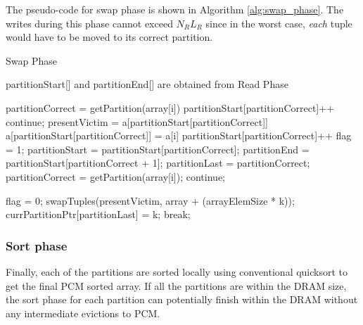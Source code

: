 The pseudo-code for swap phase is shown in Algorithm \ref{alg:swap_phase}. The writes during this phase cannot exceed $N_R L_R$ since in the worst case, \emph{each} tuple would have to be moved to its correct partition.

\begin{algorithm}
\caption{Swap Phase}
\label{alg:swap_phase}
partitionStart[] and partitionEnd[] are obtained from Read Phase
\begin{algorithmic}[1]
	\State partitionCorrect = getPartition(array[i])
     \State partitionStart[partitionCorrect]++
	\State continue;
     \Else
			\State presentVictim = a[partitionStart[partitionCorrect]]             
            \State a[partitionStart[partitionCorrect]] = a[i]
            \State partitionStart[partitionCorrect]++
            \State flag = 1;
                \State partitionStart = partitionStart[partitionCorrect];
                \State partitionEnd = partitionStart[partitionCorrect + 1];
                \State partitionLast = partitionCorrect;
                \State partitionCorrect = getPartition(array[i]);
                        \State continue;
                        
                        \State flag = 0;
                    \EndIf
                    \State swapTuples(presentVictim, array + (arrayElemSize * k));
                    \State currPartitionPtr[partitionLast] = k;
                    \State break;
             
				\EndFor
			\EndWhile
	\EndIf
\EndFor
{}
\end{algorithmic}
\end{algorithm}


\subsubsection{Sort phase}
Finally, each of the partitions are sorted locally using conventional quicksort to get the final PCM sorted array. If all the partitions are within the DRAM size, the sort phase for each partition can potentially finish within the DRAM without any intermediate evictions to PCM. 

